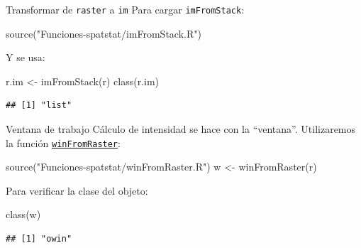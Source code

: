 \documentclass[
  11pt,
  ignorenonframetext,
]{beamer}
\newenvironment{Shaded}{}{}
\newcommand{\FunctionTok}[1]{\textcolor[rgb]{0.02,0.16,0.49}{#1}}
\newcommand{\NormalTok}[1]{#1}
\newcommand{\OtherTok}[1]{\textcolor[rgb]{0.00,0.44,0.13}{#1}}
\newcommand{\StringTok}[1]{\textcolor[rgb]{0.25,0.44,0.63}{#1}}
\begin{document}
\begin{frame}[fragile]{Transformar de \texttt{raster} a \texttt{im}}
\protect\hypertarget{transformar-de-raster-a-im-1}{}
Para cargar \texttt{imFromStack}:

\begin{Shaded}
\begin{Highlighting}[]
\FunctionTok{source}\NormalTok{(}\StringTok{"Funciones{-}spatstat/imFromStack.R"}\NormalTok{)}
\end{Highlighting}
\end{Shaded}

Y se usa:

\begin{Shaded}
\begin{Highlighting}[]
\NormalTok{r.im }\OtherTok{\textless{}{-}} \FunctionTok{imFromStack}\NormalTok{(r)}
\FunctionTok{class}\NormalTok{(r.im)}
\end{Highlighting}
\end{Shaded}

\begin{verbatim}
## [1] "list"
\end{verbatim}
\end{frame}

\begin{frame}[fragile]{Ventana de trabajo}
\protect\hypertarget{ventana-de-trabajo}{}
Cálculo de intensidad se hace con la ``ventana''. Utilizaremos la
función
\href{Funciones-spatstat/winFromRaster.R}{\texttt{winFromRaster}}:

\begin{Shaded}
\begin{Highlighting}[]
\FunctionTok{source}\NormalTok{(}\StringTok{"Funciones{-}spatstat/winFromRaster.R"}\NormalTok{)}
\NormalTok{w }\OtherTok{\textless{}{-}} \FunctionTok{winFromRaster}\NormalTok{(r)}
\end{Highlighting}
\end{Shaded}

Para verificar la clase del objeto:

\begin{Shaded}
\begin{Highlighting}[]
\FunctionTok{class}\NormalTok{(w)}
\end{Highlighting}
\end{Shaded}

\begin{verbatim}
## [1] "owin"
\end{verbatim}
\end{frame}
\end{document}
